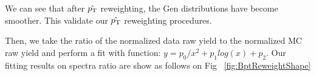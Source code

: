 We can see that after $\hat {p_{\mathrm{T}}}$ reweighting, the Gen \pt distributions have become smoother. This validate our $\hat {p_{\mathrm{T}}}$ reweighting procedures. 



Then, we take the ratio of the normalized data raw yield to the normalized MC raw yield and perform a fit with function: $y = p_0/x^2 + p_1 log(x) + p_2$. Our fitting results on spectra ratio are show as follows on Fig~ \ref{fig:BptReweightShape}


